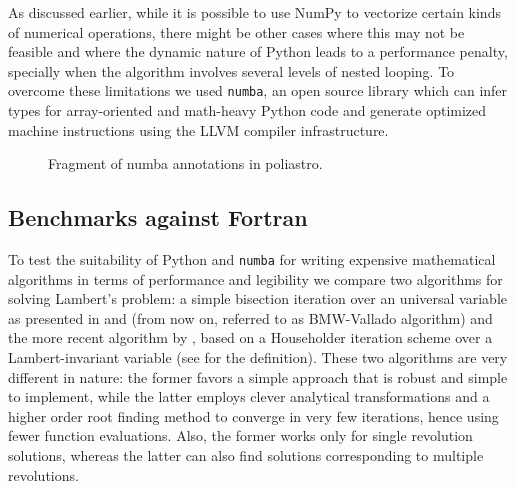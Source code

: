 As discussed earlier, while it is possible to use NumPy\cite{van_der_Walt_2011} to vectorize certain kinds of numerical operations, there might be other cases where this may not be feasible and where the dynamic nature of Python leads to a performance penalty, specially when the algorithm involves several levels of nested looping. To overcome these limitations we used \verb|numba|, an open source library which can infer types for array-oriented and math-heavy Python code and generate optimized machine instructions using the LLVM compiler infrastructure\cite{numba}.

\newsavebox\myv

\begin{lrbox}{\myv}\begin{minipage}{\textwidth}

\end{minipage}\end{lrbox}

\begin{figure*}
  \centering
    \resizebox{\textwidth}{!}{\usebox\myv}
  \caption{Fragment of numba annotations in poliastro.}
\end{figure*}

\subsection{Benchmarks against Fortran}

To test the suitability of Python and \verb|numba| for writing expensive mathematical algorithms in terms of performance and legibility we compare two algorithms for solving Lambert's problem: a simple bisection iteration over an universal variable as presented in \cite{bate1971fundamentals} and \cite{vallado2001fundamentals} (from now on, referred to as BMW-Vallado algorithm) and the more recent algorithm by \cite{Izzo2014}, based on a Householder iteration scheme over a Lambert-invariant variable (see \cite{gooding1990procedure} for the definition). These two algorithms are very different in nature: the former favors a simple approach that is robust and simple to implement, while the latter employs clever analytical transformations and a higher order root finding method to converge in very few iterations, hence using fewer function evaluations. Also, the former works only for single revolution solutions, whereas the latter can also find solutions corresponding to multiple revolutions.

